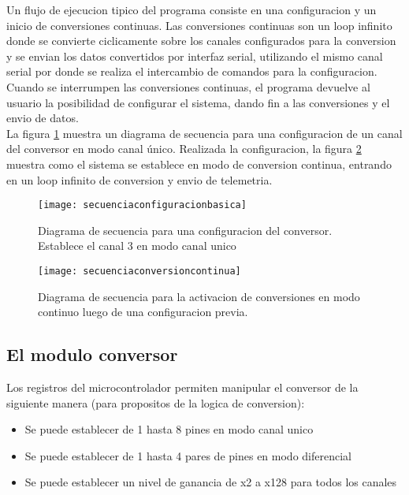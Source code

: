 Un flujo de ejecucion tipico del programa consiste en una configuracion y un inicio de conversiones continuas. Las conversiones continuas son un loop infinito donde se convierte ciclicamente sobre los canales configurados para la conversion y se envian los datos convertidos por interfaz serial, utilizando el mismo canal serial por donde se realiza el intercambio de comandos para la configuracion. Cuando se interrumpen las conversiones continuas, el programa devuelve al usuario la posibilidad de configurar el sistema, dando fin a las conversiones y el envio de datos. \\

La figura \ref{fig:secuenciaconfiguracionbasica} muestra un diagrama de secuencia para una configuracion de un canal del conversor en modo canal único. Realizada la configuracion, la figura \ref{fig:secuenciaconversioncontinua} muestra como el sistema se establece en modo de conversion continua, entrando en un loop infinito de conversion y envio de telemetria.

\begin{figure}[h]
  \centering
  \texttt{[image: secuenciaconfiguracionbasica]}
  \caption{Diagrama de secuencia para una configuracion del conversor. Establece el canal 3 en modo canal unico}\label{fig:secuenciaconfiguracionbasica}
\end{figure}

\begin{figure}[h]
  \centering
  \texttt{[image: secuenciaconversioncontinua]}
  \caption{Diagrama de secuencia para la activacion de conversiones en modo continuo luego de una configuracion previa.}\label{fig:secuenciaconversioncontinua}
\end{figure}



\subsection{El modulo conversor} %
\label{it2:sub:el_modulo_conversor}

Los registros del microcontrolador permiten manipular el conversor de la siguiente manera (para propositos de la logica de conversion):

\begin{itemize}
  \item Se puede establecer de 1 hasta 8 pines en modo canal unico
  \item Se puede establecer de 1 hasta 4 pares de pines en modo diferencial
  \item Se puede establecer un nivel de ganancia de x2 a x128 para todos los canales
\end{itemize}

